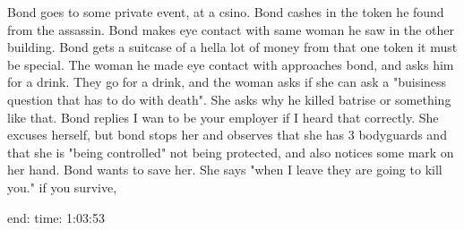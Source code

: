 \documentclass{article}
\begin{document}
    Bond goes to some private event, at a csino. Bond cashes in the token he found from the
    assassin. Bond makes eye contact with same woman he saw in the other building.
    Bond gets a suitcase of a hella lot of money from that one token
    it must be special. The woman he made eye contact with approaches bond,
    and asks him for a drink. They go for a drink, and the woman asks if she can ask
    a "buisiness question that has to do with death". She asks why he killed batrise or something like that.
    Bond replies I wan to be your employer if I heard that correctly. She excuses herself,
    but bond stops her and observes that she has 3 bodyguards and that she is "being controlled" not being protected,
    and also notices some mark on her hand.
    Bond wants to save her. She says "when I leave they are going to kill you."
    if you survive,

    end: time: 1:03:53
\end{document}
